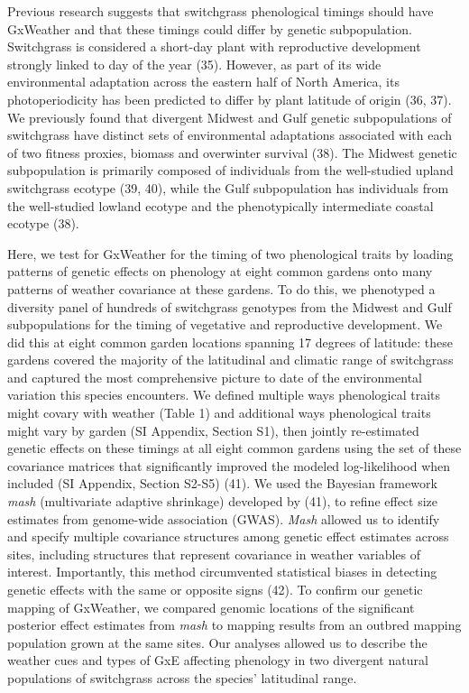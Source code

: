\documentclass[
  9pt,
  twocolumn,
  twoside]{pnas-new}
\begin{document}
Previous research suggests that switchgrass phenological timings should
have GxWeather and that these timings could differ by genetic
subpopulation. Switchgrass is considered a short-day plant with
reproductive development strongly linked to day of the year (35).
However, as part of its wide environmental adaptation across the eastern
half of North America, its photoperiodicity has been predicted to differ
by plant latitude of origin (36, 37). We previously found that divergent
Midwest and Gulf genetic subpopulations of switchgrass have distinct
sets of environmental adaptations associated with each of two fitness
proxies, biomass and overwinter survival (38). The Midwest genetic
subpopulation is primarily composed of individuals from the well-studied
upland switchgrass ecotype (39, 40), while the Gulf subpopulation has
individuals from the well-studied lowland ecotype and the phenotypically
intermediate coastal ecotype (38).

Here, we test for GxWeather for the timing of two phenological traits by
loading patterns of genetic effects on phenology at eight common gardens
onto many patterns of weather covariance at these gardens. To do this,
we phenotyped a diversity panel of hundreds of switchgrass genotypes
from the Midwest and Gulf subpopulations for the timing of vegetative
and reproductive development. We did this at eight common garden
locations spanning 17 degrees of latitude: these gardens covered the
majority of the latitudinal and climatic range of switchgrass and
captured the most comprehensive picture to date of the environmental
variation this species encounters. We defined multiple ways phenological
traits might covary with weather (Table 1) and additional ways
phenological traits might vary by garden (SI Appendix, Section S1), then
jointly re-estimated genetic effects on these timings at all eight
common gardens using the set of these covariance matrices that
significantly improved the modeled log-likelihood when included (SI
Appendix, Section S2-S5) (41). We used the Bayesian framework
\emph{mash} (multivariate adaptive shrinkage) developed by (41), to
refine effect size estimates from genome-wide association (GWAS).
\emph{Mash} allowed us to identify and specify multiple covariance
structures among genetic effect estimates across sites, including
structures that represent covariance in weather variables of interest.
Importantly, this method circumvented statistical biases in detecting
genetic effects with the same or opposite signs (42). To confirm our
genetic mapping of GxWeather, we compared genomic locations of the
significant posterior effect estimates from \emph{mash} to mapping
results from an outbred mapping population grown at the same sites. Our
analyses allowed us to describe the weather cues and types of GxE
affecting phenology in two divergent natural populations of switchgrass
across the species' latitudinal range.
\end{document}
